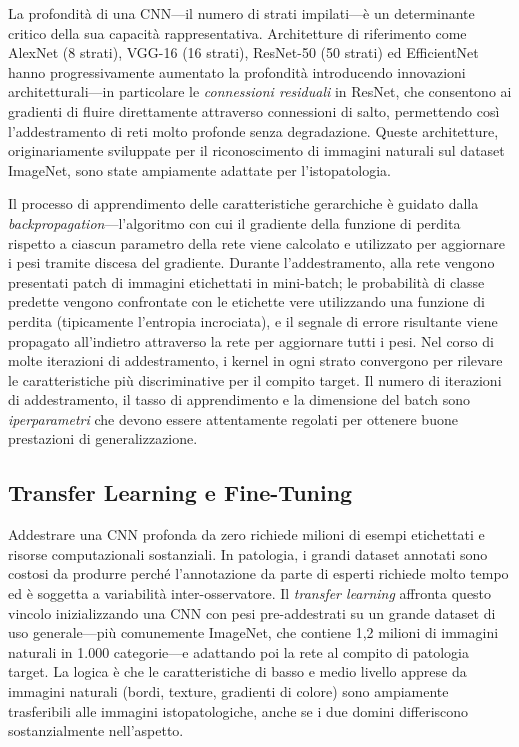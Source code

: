 La profondità di una CNN---il numero di strati impilati---è un determinante critico della sua capacità rappresentativa. Architetture di riferimento come AlexNet (8 strati), VGG-16 (16 strati), ResNet-50 (50 strati) ed EfficientNet hanno progressivamente aumentato la profondità introducendo innovazioni architetturali---in particolare le \emph{connessioni residuali} in ResNet, che consentono ai gradienti di fluire direttamente attraverso connessioni di salto, permettendo così l'addestramento di reti molto profonde senza degradazione. Queste architetture, originariamente sviluppate per il riconoscimento di immagini naturali sul dataset ImageNet, sono state ampiamente adattate per l'istopatologia.

Il processo di apprendimento delle caratteristiche gerarchiche è guidato dalla \emph{backpropagation}---l'algoritmo con cui il gradiente della funzione di perdita rispetto a ciascun parametro della rete viene calcolato e utilizzato per aggiornare i pesi tramite discesa del gradiente. Durante l'addestramento, alla rete vengono presentati patch di immagini etichettati in mini-batch; le probabilità di classe predette vengono confrontate con le etichette vere utilizzando una funzione di perdita (tipicamente l'entropia incrociata), e il segnale di errore risultante viene propagato all'indietro attraverso la rete per aggiornare tutti i pesi. Nel corso di molte iterazioni di addestramento, i kernel in ogni strato convergono per rilevare le caratteristiche più discriminative per il compito target. Il numero di iterazioni di addestramento, il tasso di apprendimento e la dimensione del batch sono \emph{iperparametri} che devono essere attentamente regolati per ottenere buone prestazioni di generalizzazione.

\subsection{Transfer Learning e Fine-Tuning}

Addestrare una CNN profonda da zero richiede milioni di esempi etichettati e risorse computazionali sostanziali. In patologia, i grandi dataset annotati sono costosi da produrre perché l'annotazione da parte di esperti richiede molto tempo ed è soggetta a variabilità inter-osservatore. Il \emph{transfer learning} affronta questo vincolo inizializzando una CNN con pesi pre-addestrati su un grande dataset di uso generale---più comunemente ImageNet, che contiene 1,2 milioni di immagini naturali in 1.000 categorie---e adattando poi la rete al compito di patologia target. La logica è che le caratteristiche di basso e medio livello apprese da immagini naturali (bordi, texture, gradienti di colore) sono ampiamente trasferibili alle immagini istopatologiche, anche se i due domini differiscono sostanzialmente nell'aspetto.

